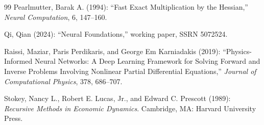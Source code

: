 \begin{thebibliography}{99}
Pearlmutter, Barak A. (1994): ``Fast Exact Multiplication by the Hessian,'' \emph{Neural Computation}, 6, 147--160.

Qi, Qian (2024): ``Neural Foundations,'' working paper, SSRN 5072524.

Raissi, Maziar, Paris Perdikaris, and George Em Karniadakis (2019): ``Physics-Informed Neural Networks: A Deep Learning Framework for Solving Forward and Inverse Problems Involving Nonlinear Partial Differential Equations,'' \emph{Journal of Computational Physics}, 378, 686--707.

Stokey, Nancy L., Robert E. Lucas, Jr., and Edward C. Prescott (1989): \emph{Recursive Methods in Economic Dynamics}. Cambridge, MA: Harvard University Press.

\par
\end{thebibliography}

